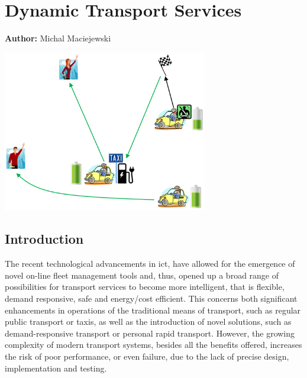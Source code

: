 \chapter{Dynamic Transport Services}
\label{ch:dts}

\hfill \textbf{Author:} Michal Maciejewski

\begin{center} \includegraphics[width=0.67\textwidth, angle=0]{extending/figures/DTS/eTaxiDispMatsimBook.png} \end{center}

{
\citet{MaciejewskiNagel2013TaxiSimulation, MaciejewskiNagel2013OnlineTaxisVSPWP, MaciejewskiNagel2013CooperationTaxiDispatching, Maciejewski2014OnlineViaOffline}
}

\section{Introduction}
The recent technological advancements in \gls{ict}, have allowed for the emergence of novel on-line fleet management tools and, thus, opened up a broad range of possibilities for transport services to become more intelligent, that is flexible, demand responsive, safe and energy/cost efficient. This concerns both significant enhancements in operations of the traditional means of transport, such as regular public transport or taxis, as well as the introduction of novel solutions, such as demand-responsive transport or personal rapid transport. However, the growing complexity of modern transport systems, besides all the benefits offered, increases the risk of poor performance, or even failure, due to the lack of precise design, implementation and testing.

